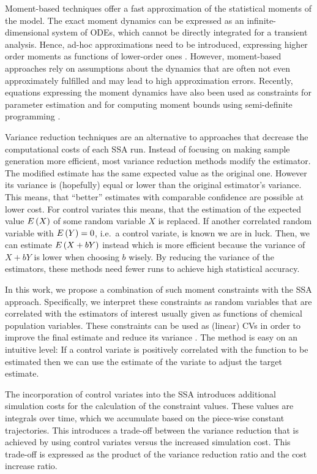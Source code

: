 Moment-based techniques offer a fast approximation of the statistical
moments of the model.
The exact moment dynamics can be expressed as an infinite-dimensional
system of \acp{ODE}, which cannot be directly  integrated for a
transient analysis.
Hence, ad-hoc approximations need to be introduced, expressing higher
order moments as functions of lower-order ones
\parencite{ale2013general,engblom2006computing}.
However, moment-based approaches rely on assumptions about the dynamics that are
often not even approximately fulfilled and may lead to high
approximation errors.
Recently, equations expressing the moment dynamics have also been
used as constraints for parameter
estimation \parencite{backenkohler2018moment} and for computing
moment bounds using semi-definite programming
\parencite{dowdy2018dynamic,ghusinga2017exact}.

Variance reduction techniques are an alternative to approaches that
decrease the computational costs of each SSA run.
Instead of focusing on making sample generation more efficient, most
variance reduction methods modify the estimator.
The modified estimate has the same expected value as the original one.
However its variance is (hopefully) equal or lower than the original
estimator's variance.
This means, that ``better'' estimates with comparable confidence are
possible at lower cost.
For control variates this means, that the estimation of the expected
value ${E}\left(X\right)$ of some random variable $X$ is replaced.
If another correlated random variable with ${E}\left(Y\right)=0$, i.e.\ a control
variate, is known we are in luck.
Then, we can estimate ${E}\left(X+bY\right)$ instead which is more efficient
because the variance of $X+bY$ is lower when choosing $b$ wisely.
By reducing the variance of the estimators, these methods need fewer
runs to achieve high statistical accuracy.

In this work, we propose a combination of such moment constraints
with the \ac{SSA} approach.
Specifically, we   interpret these constraints as random variables
that are correlated with the estimators of interest usually given as
functions of chemical population variables.
These constraints can be used  as  (linear) \acfp{CV} in order to
improve the final estimate and reduce its variance
\parencite{lavenberg1982statistical,szechtman2003control}.
The method is easy on an intuitive level: If a control variate
is positively correlated with the function to be estimated then
we can use the estimate of the variate to
adjust the target estimate.

The incorporation of control variates into the \ac{SSA}
introduces   additional simulation costs for the calculation of the
constraint values.
These values are integrals over time, which we accumulate  based on the
piece-wise constant trajectories.
This introduces a trade-off between the variance reduction that is achieved
by using control variates versus the increased simulation cost.
This trade-off is expressed as the product of the variance reduction ratio
and the cost increase ratio.

